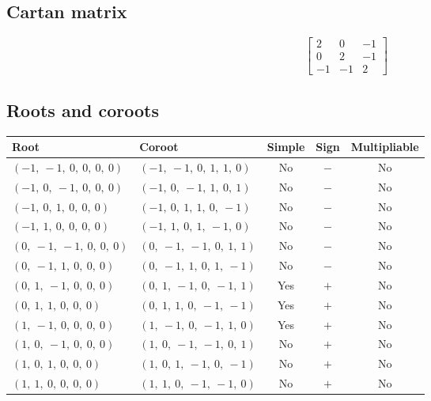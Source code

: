 \documentclass[11pt]{article}
\theoremstyle{definition}
\begin{document}
\subsection{Cartan matrix}
\[
\left[\begin{matrix}2 & 0 & -1\\0 & 2 & -1\\-1 & -1 & 2\end{matrix}\right]
\]

\subsection{Roots and coroots}
\begin{center}
\begin{tabular}{|l|l|c|c|c|}
    \hline
    \textbf{Root} & \textbf{Coroot} & \textbf{Simple} & \textbf{Sign} & \textbf{Multipliable} \\
    \hline
    $\left( -1, \  -1, \  0, \  0, \  0, \  0\right)$ & $\left( -1, \  -1, \  0, \  1, \  1, \  0\right)$ & No & $-$ & No \\
    \hline
    $\left( -1, \  0, \  -1, \  0, \  0, \  0\right)$ & $\left( -1, \  0, \  -1, \  1, \  0, \  1\right)$ & No & $-$ & No \\
    \hline
    $\left( -1, \  0, \  1, \  0, \  0, \  0\right)$ & $\left( -1, \  0, \  1, \  1, \  0, \  -1\right)$ & No & $-$ & No \\
    \hline
    $\left( -1, \  1, \  0, \  0, \  0, \  0\right)$ & $\left( -1, \  1, \  0, \  1, \  -1, \  0\right)$ & No & $-$ & No \\
    \hline
    $\left( 0, \  -1, \  -1, \  0, \  0, \  0\right)$ & $\left( 0, \  -1, \  -1, \  0, \  1, \  1\right)$ & No & $-$ & No \\
    \hline
    $\left( 0, \  -1, \  1, \  0, \  0, \  0\right)$ & $\left( 0, \  -1, \  1, \  0, \  1, \  -1\right)$ & No & $-$ & No \\
    \hline
    $\left( 0, \  1, \  -1, \  0, \  0, \  0\right)$ & $\left( 0, \  1, \  -1, \  0, \  -1, \  1\right)$ & Yes & $+$ & No \\
    \hline
    $\left( 0, \  1, \  1, \  0, \  0, \  0\right)$ & $\left( 0, \  1, \  1, \  0, \  -1, \  -1\right)$ & Yes & $+$ & No \\
    \hline
    $\left( 1, \  -1, \  0, \  0, \  0, \  0\right)$ & $\left( 1, \  -1, \  0, \  -1, \  1, \  0\right)$ & Yes & $+$ & No \\
    \hline
    $\left( 1, \  0, \  -1, \  0, \  0, \  0\right)$ & $\left( 1, \  0, \  -1, \  -1, \  0, \  1\right)$ & No & $+$ & No \\
    \hline
    $\left( 1, \  0, \  1, \  0, \  0, \  0\right)$ & $\left( 1, \  0, \  1, \  -1, \  0, \  -1\right)$ & No & $+$ & No \\
    \hline
    $\left( 1, \  1, \  0, \  0, \  0, \  0\right)$ & $\left( 1, \  1, \  0, \  -1, \  -1, \  0\right)$ & No & $+$ & No \\
    \hline
\end{tabular}
\end{center}
\end{document}
